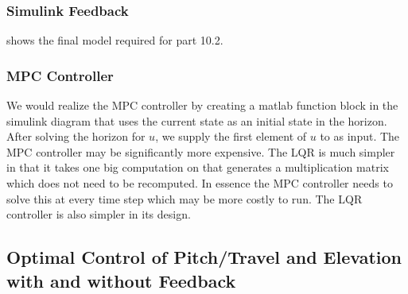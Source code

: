 \subsubsection{Simulink Feedback}

 shows the final model required for part 10.2.


\subsubsection{MPC Controller}
We would realize the MPC controller by creating a matlab function block in the simulink diagram that uses the current state as an initial state in the horizon. After solving the horizon for $u$, we supply the first element of $u$ to as input.
The MPC controller may be significantly more expensive. The LQR is much simpler in that it takes one big computation on that generates a multiplication matrix which does not need to be recomputed. In essence the MPC controller needs to solve this at every time step which may be more costly to run. The LQR controller is also simpler in its design.


\subsection{Optimal Control of Pitch/Travel and Elevation with and without Feedback}
